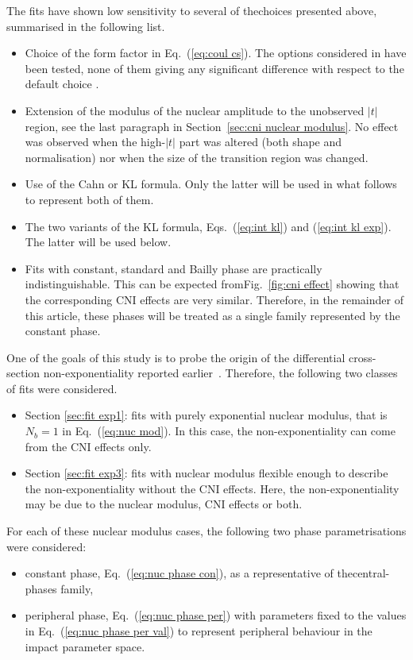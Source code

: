 The fits have shown low sensitivity to several of the\Break choices presented above, summarised in the following list. 
\begin{itemize}
\item Choice of the form factor in Eq.~(\ref{eq:coul cs}). The options considered in \cite{elegent} have been tested, none of them giving any significant difference with respect to the default choice \cite{puckett10}.
\item Extension of the modulus of the nuclear amplitude to the unobserved $|t|$ region, see the last paragraph in Section~\ref{sec:cni nuclear modulus}. No effect was observed when the high-$|t|$ part was altered (both shape and normalisation) nor when the size of the transition region was changed.
\item Use of the Cahn or KL formula. Only the latter will be used in what follows to represent both of them.
\item The two variants of the KL formula, Eqs.~(\ref{eq:int kl}) and (\ref{eq:int kl exp}). The latter will be used below.
\item Fits with constant, standard and Bailly phase are practically indistinguishable. This can be expected from\Break Fig.~\ref{fig:cni effect} showing that the corresponding CNI effects are very similar. Therefore, in the remainder of this article, these phases will be treated as a single family represented by the constant phase.
\end{itemize}


One of the goals of this study is to probe the origin of the differential cross-section non-exponentiality reported earlier~\cite{8tev-90m}. Therefore, the following two classes of fits were considered.
\begin{itemize}
\item Section \ref{sec:fit exp1}: fits with purely exponential nuclear modulus, that is $N_b=1$ in Eq.~(\ref{eq:nuc mod}). In this case, the non-exponentiality can come from the CNI effects only.
\item Section \ref{sec:fit exp3}: fits with nuclear modulus flexible enough to describe the non-exponentiality without the CNI effects. Here, the non-exponentiality may be due to the nuclear modulus, CNI effects or both.
\end{itemize}
For each of these nuclear modulus cases, the following two phase parametrisations were considered:
\begin{itemize}\setlength\itemsep{0pt}
\item constant phase, Eq.~(\ref{eq:nuc phase con}), as a representative of the\Break central-phases family,
\item peripheral phase, Eq.~(\ref{eq:nuc phase per}) with parameters fixed to the values in Eq.~(\ref{eq:nuc phase per val}) to represent peripheral behaviour in the impact parameter space.
\end{itemize}


